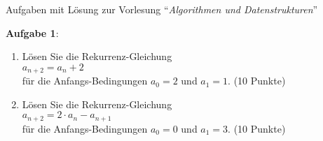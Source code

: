 \documentclass{article}
\begin{document}
\noindent
{\large Aufgaben mit L\"osung zur Vorlesung  ``{\sl Algorithmen und Datenstrukturen}''}
\vspace{0.5cm}


\noindent
\textbf{Aufgabe 1}:
\begin{enumerate}
\item L\"osen Sie die Rekurrenz-Gleichung \\[0.2cm]
      \hspace*{1.3cm} $a_{n+2} = a_n + 2$ \\[0.2cm]
      f\"ur die Anfangs-Bedingungen $a_0 = 2$ und $a_1 = 1$.
      \hspace*{\fill} (10 Punkte)
\item L\"osen Sie die Rekurrenz-Gleichung \\[0.2cm]
      \hspace*{1.3cm} $a_{n+2} = 2 \cdot a_n - a_{n+1}$ \\[0.2cm]
      f\"ur die Anfangs-Bedingungen $a_0 = 0$ und $a_1 = 3$.
      \hspace*{\fill} (10 Punkte)
\end{enumerate}
\vspace{0.1cm}
\end{document}
